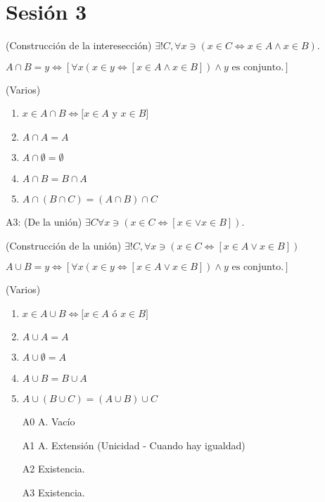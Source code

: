 \section{Sesión 3}

\begin{teorema}(Construcción de la interesección)
	$\exists ! C, \forall x\ni (x\in C\iff x\in A\wedge x\in B)$.
\end{teorema}
\begin{definicion}
	$A\cap B = y\iff \left[\forall x(x\in y\iff [x\in A\wedge x\in B])\wedge y \text{ es conjunto.}\right]$
\end{definicion}

\begin{teorema}(Varios)
	\begin{enumerate}
		\item $x \in A \cap B \Leftrightarrow[x \in A$ y $x \in B]$
		\item$A \cap A=A$
		\item $A \cap \emptyset=\emptyset$
		\item $A \cap B=B \cap A$
		\item $A \cap(B \cap C)=(A \cap B) \cap C$
	\end{enumerate}
\end{teorema}

A3: (De la unión) $\exists C\forall x\ni (x\in C\iff [x\in \vee x\in B])$.
\begin{teorema}(Construcción de la unión)
	$\exists ! C, \forall x \ni (x\in C\iff [x\in A \vee x\in B])$
\end{teorema}

\begin{definicion}
	$A\cup B = y\iff \left[\forall x(x\in y\iff [x\in A\vee x\in B])\wedge y \text{ es conjunto.}\right]$
\end{definicion}

\begin{teorema}(Varios)
	\begin{enumerate}
		\item $x \in A \cup B \Leftrightarrow[x \in A$ ó $x \in B]$
		\item $A \cup A=A$
		\item $A \cup \emptyset=A$
		\item $A \cup B=B \cup A$
		\item $A \cup(B \cup C)=(A \cup B) \cup C$
	\end{enumerate}
\end{teorema}

\begin{enumerate}
	\item[A0] A. Vacío 
	\item[A1] A. Extensión (Unicidad - Cuando hay igualdad)
	\item[A2] Existencia.
	\item[A3] Existencia. 
\end{enumerate}

